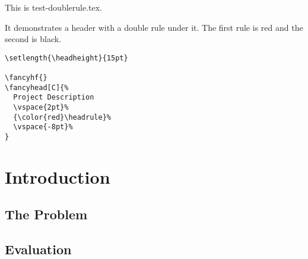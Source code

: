\documentclass[openany]{book}
\begin{document}
\tableofcontents

\bigskip

\noindent
\begin{boxedminipage}{\textwidth}
  This is test-doublerule.tex.

  It demonstrates a header with a double rule under it. The first rule
  is red and the second is black.

\begin{verbatim}
\setlength{\headheight}{15pt}

\fancyhf{}
\fancyhead[C]{%
  Project Description
  \vspace{2pt}%
  {\color{red}\headrule}%
  \vspace{-8pt}%
}
\end{verbatim}
\end{boxedminipage}

\chapter{Introduction}
\lipsum[1]

\section{The Problem}
\label{sec:problem}

\lipsum[2-3]

\section{Evaluation}

\lipsum[3-5]
\end{document}
